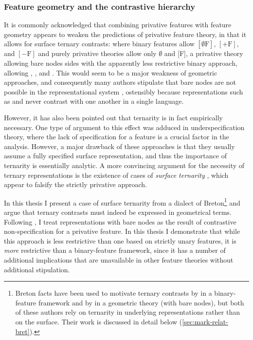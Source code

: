 \subsubsection{Feature geometry and the contrastive hierarchy}
\label{sec:feat-geom-contr}

It is commonly acknowledged \citep[\cfm][]{christian-mfm16talk} that combining privative features with feature geometry appears to weaken the predictions of privative feature theory, in that it allows for surface ternary contrasts: where binary features allow $[\emptyset\mbox{F}]$, $[+\mbox{F}]$, and $[-\mbox{F}]$ and purely privative theories allow only $\emptyset$ and [F], a privative theory allowing bare nodes sides with the apparently less restrictive binary approach, allowing \featurestring{\rt}, , and . This would seem to be a major weakness of geometric approaches, and consequently many authors stipulate that bare nodes are not possible in the representational system \citep[\egm][]{lombardi95:_book}, ostensibly because representations such as \featurestring{\rt} and  never contrast with one another in a single language.

However, it has also been pointed out that ternarity is in fact empirically necessary. One type of argument to this effect was adduced in underspecification theory, where the lack of specification for a feature is a crucial factor in the analysis. However, a major drawback of these approaches is that they usually assume a fully specified surface representation, and thus the importance of ternarity is essentially analytic. A more convincing argument for the necessity of ternary representations is the existence of cases of \emph{surface ternarity} \citep{kim02:_phonol,strycharczuk12:_phonet}, which appear to falsify the strictly privative approach.

In this thesis I present a case of surface ternarity from a dialect of Breton\footnote{Breton facts have been used to motivate ternary contrasts by \citet{kramer-breton} in a binary\hyp feature framework and by \citet{hall09:_laryn_breton} in a geometric theory (with bare nodes), but both of these authors rely on ternarity in underlying representations rather than on the surface. Their work is discussed in detail below (\cref{sec:mark-relat-bret}).} and argue that ternary contrasts must indeed be expressed in geometrical terms. Following \citet{ghini01:_asymm_miogl,ghini01:_place}, I treat representations with bare nodes as the result of contrastive non\hyp specification for a privative feature. In this thesis I demonstrate that while this approach is less restrictive than one based on strictly unary features, it is \emph{more} restrictive than a binary\hyp feature framework, since it has a number of additional implications that are unavailable in other feature theories without additional stipulation.


